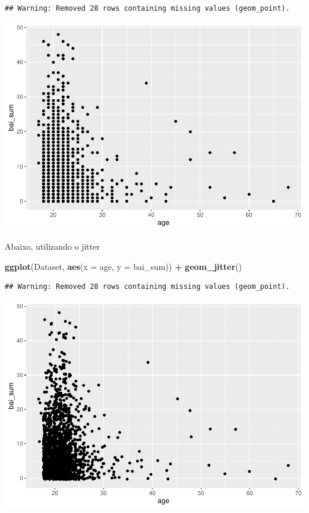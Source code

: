 \documentclass[
]{book}
\newenvironment{Shaded}{\begin{snugshade}}{\end{snugshade}}
\newcommand{\DataTypeTok}[1]{\textcolor[rgb]{0.13,0.29,0.53}{#1}}
\newcommand{\KeywordTok}[1]{\textcolor[rgb]{0.13,0.29,0.53}{\textbf{#1}}}
\newcommand{\NormalTok}[1]{#1}
\newcommand{\OperatorTok}[1]{\textcolor[rgb]{0.81,0.36,0.00}{\textbf{#1}}}
\newcommand{\StringTok}[1]{\textcolor[rgb]{0.31,0.60,0.02}{#1}}
\begin{document}
\begin{verbatim}
## Warning: Removed 28 rows containing missing values (geom_point).
\end{verbatim}

\begin{center}\includegraphics{gitbook-demo_files/figure-latex/unnamed-chunk-22-1} \end{center}

Abaixo, utilizando o jitter

\begin{Shaded}
\begin{Highlighting}[]
\KeywordTok{ggplot}\NormalTok{(Dataset, }\KeywordTok{aes}\NormalTok{(}\DataTypeTok{x =}\NormalTok{ age, }\DataTypeTok{y =}\NormalTok{ bai_sum)) }\OperatorTok{+}
\StringTok{  }\KeywordTok{geom_jitter}\NormalTok{()}
\end{Highlighting}
\end{Shaded}

\begin{verbatim}
## Warning: Removed 28 rows containing missing values (geom_point).
\end{verbatim}

\begin{center}\includegraphics{gitbook-demo_files/figure-latex/unnamed-chunk-23-1} \end{center}
\end{document}
